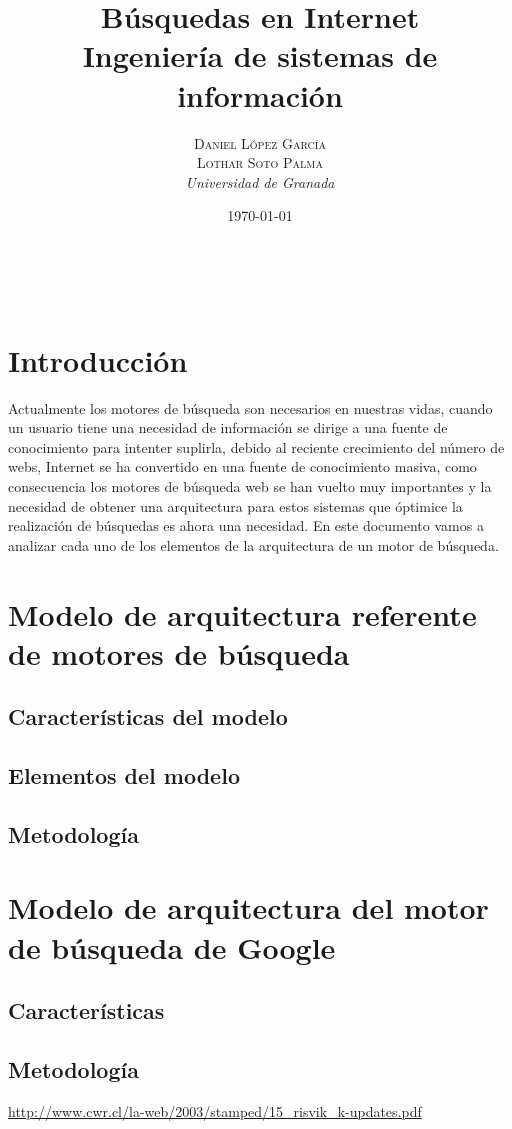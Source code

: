 \documentclass[a4paper, 11pt]{article} %
\title{\textbf{Búsquedas en Internet}\\ %
\vspace{20 pt}
Ingeniería de sistemas de información} %
\author{\textsc{Daniel López García\\
Lothar Soto Palma} %
\\{\textit{Universidad de Granada}}} %
\date{\today} %
\makeatletter
\renewcommand{\maketitle}{ %
\begin{center} %
{\Huge\@title} %
\end{center}

\vspace{20pt} %

\begin{flushright} %
{\large\@author} %
\\\@date %

\vspace{40pt} %
\end{flushright}
\renewcommand{\baselinestretch}{0.5}

}
\makeatother
\begin{document}
	\maketitle
	\tableofcontents
	\listoffigures
	\newpage

	\section{Introducción}
	Actualmente los motores de búsqueda son necesarios en nuestras vidas, cuando un usuario tiene una necesidad de información se dirige a una fuente de conocimiento para intenter suplirla, debido al reciente crecimiento del número de webs, Internet se ha convertido en una fuente de conocimiento masiva, como consecuencia los motores de búsqueda web se han vuelto muy importantes y la necesidad de obtener una arquitectura para estos sistemas que óptimice la realización de búsquedas es ahora una necesidad. En este documento vamos a analizar cada uno de los elementos de la arquitectura de un motor de búsqueda.
	\section{Modelo de arquitectura referente de motores de búsqueda}
		\subsection{Características del modelo}
		\subsection{Elementos del modelo}
		\subsection{Metodología}
	\section{Modelo de arquitectura del motor de búsqueda de Google}
		\subsection{Características}
		\subsection{Metodología}

	\begin{thebibliography}{9}

		 \url{http://www.cwr.cl/la-web/2003/stamped/15_risvik_k-updates.pdf}

	\end{thebibliography}
\end{document}
